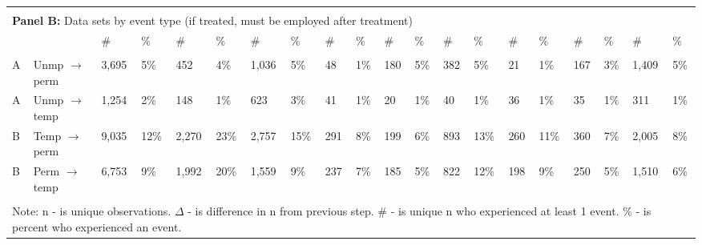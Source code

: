 \begin{tabular}{l>{\raggedright\arraybackslash}p{2.5in}llllllllllllllllll}
\hline \\[-1.8ex]  
 
\multicolumn{14}{l}{{\bf Panel B:} Data sets by event type (if treated, must be employed after treatment)} \\ 

& 
& \# & \%
& \# & \%
& \# & \%
& \# & \%
& \# & \%
& \# & \%
& \# & \%
& \# & \%
& \# & \%
\\ 
\cmidrule(lr){1-2}
\cmidrule(lr){3-4}
\cmidrule(lr){5-6}
\cmidrule(lr){7-8}
\cmidrule(lr){9-10}
\cmidrule(lr){11-12}
\cmidrule(lr){13-14}
\cmidrule(lr){15-16}
\cmidrule(lr){17-18}
\cmidrule(lr){19-20}
\\[-1.8ex]  
 
A & Unmp $\rightarrow$ perm & 3,695 & 5\% & 452 & 4\% & 1,036 & 5\% & 48 & 1\% & 180 & 5\% & 382 & 5\% & 21 & 1\% & 167 & 3\% & 1,409 & 5\% \\ 
  A & Unmp $\rightarrow$ temp & 1,254 & 2\% & 148 & 1\% & 623 & 3\% & 41 & 1\% & 20 & 1\% & 40 & 1\% & 36 & 1\% & 35 & 1\% & 311 & 1\% \\ 
  B & Temp $\rightarrow$ perm & 9,035 & 12\% & 2,270 & 23\% & 2,757 & 15\% & 291 & 8\% & 199 & 6\% & 893 & 13\% & 260 & 11\% & 360 & 7\% & 2,005 & 8\% \\ 
  B & Perm $\rightarrow$ temp & 6,753 & 9\% & 1,992 & 20\% & 1,559 & 9\% & 237 & 7\% & 185 & 5\% & 822 & 12\% & 198 & 9\% & 250 & 5\% & 1,510 & 6\% \\ 
   \hline \\[-1.8ex] \multicolumn{20}{p{12in}}{Note: n - is unique observations.  $\Delta$ - is difference in n from previous step.  \# - is unique n who experienced at least 1 event.  \% - is percent who experienced an event.} 
\end{tabular}
